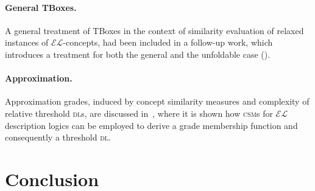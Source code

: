 \documentclass[]{llncs}
\newcommand{\el}{\(\mathcal{EL}{}\)}
\newcommand{\dl}{\textsc{dl}}
\newcommand{\csm}{\textsc{csm}}
\begin{document}
  \paragraph{General TBoxes.} A general treatment of TBoxes in the context of similarity evaluation of relaxed instances of \el-concepts, had been included in a follow-up work, which introduces a treatment for both the general and the unfoldable case (\cite{Ec14}).

  \paragraph{Approximation.} Approximation grades, induced by concept similarity measures and complexity of relative threshold \dl{}s, are discussed in~\cite{Ba17}, where it is shown how \csm{}s for \el{} description logics can be employed to derive a grade membership function and consequently a threshold \dl.

  \section{Conclusion}
\end{document}
